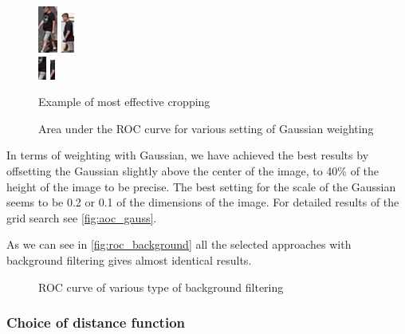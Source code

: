 \begin{figure}
    \centering
    \includegraphics{img/0.png} \includegraphics{img/1.png} \\
    \includegraphics{img/0_crop.png} \includegraphics{img/1_crop.png}
    \caption{Example of most effective cropping}
    \label{fig:best_cropping}
\end{figure}

\begin{figure}
    \centering
    \def\svgwidth{\columnwidth}
    \Large
    \scalebox{0.6}{}
    \caption{Area under the ROC curve for various setting of Gaussian weighting}
    \label{fig:aoc_gauss}
\end{figure}

In terms of weighting with Gaussian, we have achieved the best results
by offsetting the Gaussian slightly above the center of the image, to 40\%
of the height of the image to be precise. The best setting for the scale
of the Gaussian seems to be 0.2 or 0.1 of the dimensions of the image. For detailed results
of the grid search see \autoref{fig:aoc_gauss}.

As we can see in \autoref{fig:roc_background} all the selected approaches
with background filtering gives almost identical results.

\begin{figure}[tb]
    \centering
    \def\svgwidth{\columnwidth}
    
    \caption{ROC curve of various type of background filtering}
    \label{fig:roc_background}
\end{figure}

\subsubsection{Choice of distance function}

